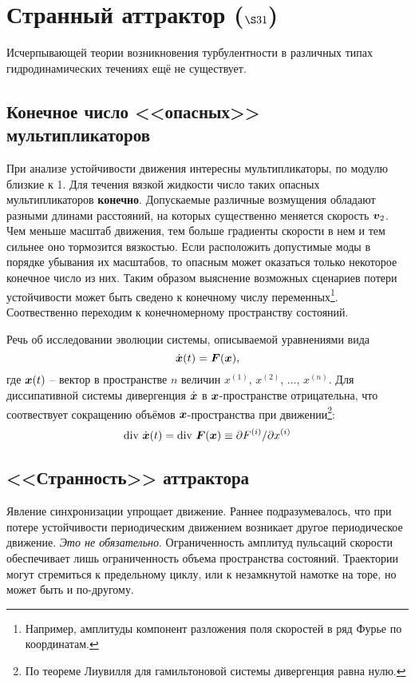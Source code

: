 \section{Странный аттрактор  \texorpdfstring{($\S 31$)}{Lg}}

Исчерпывающей теории возникновения турбулентности в различных типах гидродинамических течениях ещё не существует. 

\subsection{Конечное число <<опасных>> мультипликаторов}

При анализе устойчивости движения интересны мультипликаторы, по модулю близкие к 1. Для течения вязкой жидкости число таких опасных мультипликаторов \textbf{конечно}. Допускаемые различные возмущения обладают разными длинами расстояний, на которых существенно меняется скорость $\mbox{\boldmath $v$}_2$. Чем меньше масштаб движения, тем больше градиенты скорости в нем и тем сильнее оно тормозится вязкостью. Если расположить допустимые моды в порядке убывания их масштабов, то опасным может оказаться только некоторое конечное число из них. Таким образом выяснение возможных сценариев потери устойчивости может быть сведено к конечному числу переменных\footnote{
    Например, амплитуды компонент разложения поля скоростей в ряд Фурье по координатам.
}. Соотвественно переходим к конечномерному пространству состояний.

Речь об исследовании эволюции системы, описываемой уравнениями вида
\begin{equation}
    \dot{\mbox{\boldmath $x$}}(t) = \mbox{\boldmath $F$}(\mbox{\boldmath $x$}),
\end{equation}
где $\mbox{\boldmath $x$}(t)$ -- вектор в пространстве $n$ величин $x^{(1)}$, $x^{(2)}$, $\ldots$, $x^{(n)}$. Для диссипативной системы дивергенция $\dot{\mbox{\boldmath $x$}}$ в $\mbox{\boldmath $x$}$-пространстве отрицательна, что соотвествует сокращению объёмов $\mbox{\boldmath $x$}$-пространства при движении\footnote{
    По теореме Лиувилля для гамильтоновой системы дивергенция равна нулю.
}:
\begin{equation}
    \text{div } \dot{\mbox{\boldmath $x$}}(t) = \text{div } \mbox{\boldmath $F$}(\mbox{\boldmath $x$}) \equiv \partial F^{(i)} / \partial x^{(i)}
\end{equation}


\subsection{<<Странность>> аттрактора}

Явление синхронизации упрощает движение. Раннее подразумевалось, что при потере устойчивости периодическим движением возникает другое периодическое движение. \textit{Это не обязательно}. Ограниченность амплитуд пульсаций скорости обеспечивает лишь ограниченность объема пространства состояний. Траектории могут стремиться к предельному циклу, или к незамкнутой намотке на торе, но может быть и по-другому. 

